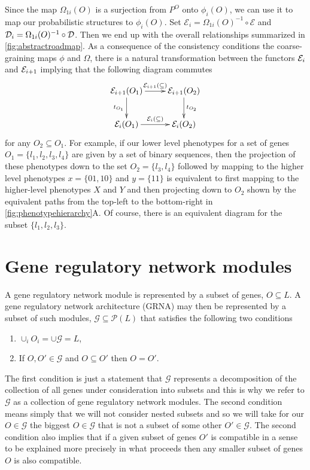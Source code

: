 Since the map $\Omega_{1i}(O)$ is a surjection from $P^O$ onto $\phi_i(O)$, we can use it to map our probabilistic structures to $\phi_i(O)$.  Set $\mathcal{E}_i = \Omega_{1i}(O)^{-1} \circ \mathcal{E}$ and $\mathcal{D}_i = \Omega_{1i}(O)^{-1} \circ \mathcal{D}$.  Then we end up with the overall relationships summarized in \ref{fig:abstractroadmap}. As a consequence of the consistency conditions the coarse-graining maps $\phi$ and $\Omega$, there is a natural transformation between the functors $\mathcal{E}_i$ and $\mathcal{E}_{i+1}$ implying that the following diagram commutes
$$
\xymatrix{
\expr_{i+1}(O_1) \ar[r]^{\expr_{i+1}(\subseteq)} \ar[d]_{t_{O_1}} & \expr_{i+1}(O_2) \ar[d]^{t_{O_2}} \\
\expr_{i}(O_1) \ar[r]^{\expr_{i}(\subseteq)} & \expr_{i}(O_2) }
$$
for any $O_2 \subseteq O_1$. For example, if our lower level phenotypes for a set of genes $O_1 = \{ l_1,l_2,l_3,l_4 \}$ are given by a set of binary sequences, then the projection of these phenotypes down to the set $O_2 = \{l_3,l_4\}$ followed by mapping to the higher level phenotypes $x=\{01,10\}$ and $y=\{11\}$ is equivalent to first mapping to the higher-level phenotypes $X$ and $Y$ and then projecting down to $O_2$ shown by the equivalent paths from the top-left to the bottom-right in \ref{fig:phenotypehierarchy}A.
Of course, there is an equivalent diagram for the subset $\{ l_1,l_2,l_3 \}$.
\section{Gene regulatory network modules}\label{sec:covergenotypespace}
A gene regulatory network module is represented by a subset of genes, $O \subseteq L$. A gene regulatory network architecture (GRNA) may then be represented by a subset of such modules, $\mathcal{G} \subseteq \mathcal{P}(L)$ that satisfies the following two conditions
\begin{enumerate}
\item $\cup_i O_i = \cup \mathcal{G} = L$,
\item If $O,O' \in \mathcal{G}$ and $O \subseteq O'$ then $O = O'$.
\end{enumerate}
The first condition is just a statement that $\mathcal{G}$ represents a decomposition of the collection of all genes under consideration into subsets and this is why we refer to $\mathcal{G}$ as a collection of gene regulatory network modules. The second condition means simply that we will not consider nested subsets and so we will take for our $O \in \mathcal{G}$ the biggest $O \in \mathcal{G}$ that is not a subset of some other $O' \in \mathcal{G}$. The second condition also implies that if a given subset of genes $O'$ is compatible in a sense to be explained more precisely in what proceeds then any smaller subset of genes $O$ is also compatible.


